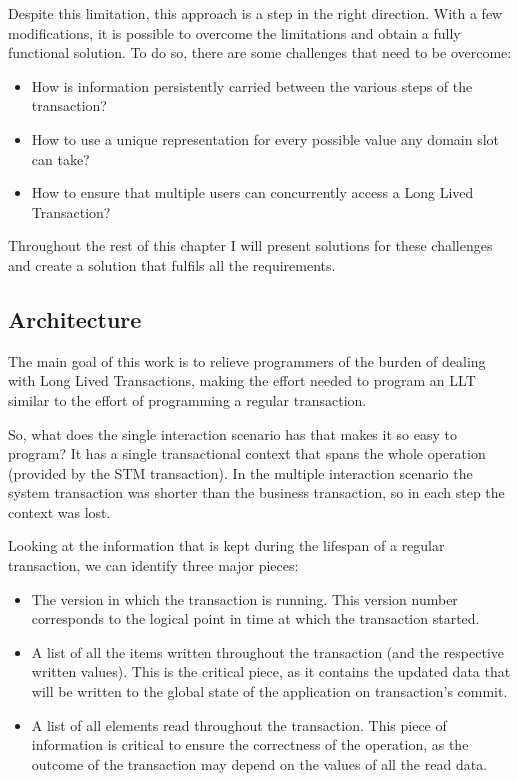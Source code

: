 \documentclass{llncs}
\begin{document}
Despite this limitation, this approach is a step in the right
direction. With a few modifications, it is possible to overcome the
limitations and obtain a fully functional solution. To do so, there
are some challenges that need to be overcome:

\begin{itemize}

\item How is information persistently carried between the various
  steps of the transaction?

\item How to use a unique representation for every possible value any
  domain slot can take?

\item How to ensure that multiple users can concurrently access a Long
  Lived Transaction?

\end{itemize}

Throughout the rest of this chapter I will present solutions for these
challenges and create a solution that fulfils all the requirements.

\subsection{Architecture}
\label{sec:arch}

The main goal of this work is to relieve programmers of the burden of
dealing with Long Lived Transactions, making the effort needed to
program an LLT similar to the effort of programming a regular
transaction.

So, what does the single interaction scenario has that makes it so
easy to program? It has a single transactional context that spans the
whole operation (provided by the STM transaction). In the multiple
interaction scenario the system transaction was shorter than the
business transaction, so in each step the context was lost.

Looking at the information that is kept during the lifespan of a
regular transaction, we can identify three major pieces:

\begin{itemize}
\item The version in which the transaction is running. This version
  number corresponds to the logical point in time at which the
  transaction started.
\item A list of all the items written throughout the transaction (and
  the respective written values). This is the critical piece, as it
  contains the updated data that will be written to the global state
  of the application on transaction's commit.
\item A list of all elements read throughout the transaction. This
  piece of information is critical to ensure the correctness of the
  operation, as the outcome of the transaction may depend on the
  values of all the read data.
\end{itemize}
\end{document}
